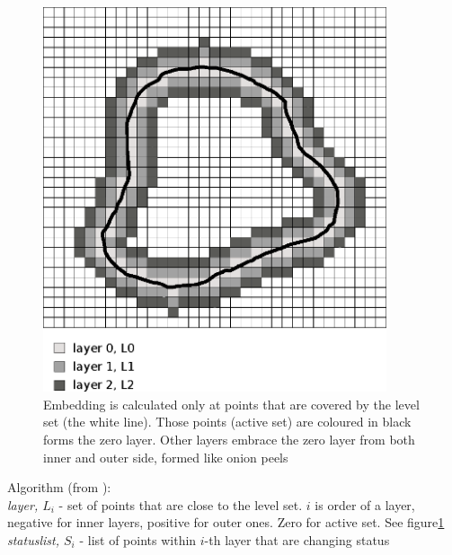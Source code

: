 \begin{figure}
    \centering
    \includegraphics[width=0.9\textwidth]{data/sparsefield}
    \caption[Sparse fields method computation illustration]{Embedding is calculated only at points that are covered by the level set (the white line). Those points (active set) are coloured in black forms the zero layer. Other layers embrace the zero layer from both inner and outer side, formed like onion peels}
    \label{fg:sparseFilelds}
\end{figure}

\par
Algorithm (from \cite{insightIntoImages}):\\
\label{alg:sparseFileld}
\emph{layer, $L_i$} - set of points that are close to the level set. $i$ is order of a layer, negative for inner layers, positive for outer ones. Zero for active set. See figure\ref{fg:sparseFilelds}\\
\emph{statuslist, $S_{i}$} - list of points within $i$-th layer that are changing status

